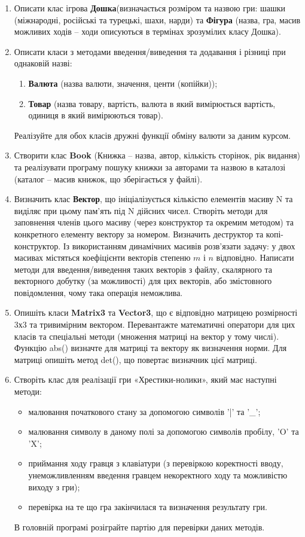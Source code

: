 \documentclass[a5paper,titlepage,openany,twoside,
]
{book_unv}%
\makeatletter
\newcommand{\xslalph}[1]{\expandafter\@xslalph\csname c@#1\endcsname}
\newcommand{\@xslalph}[1]{%
    \ifcase#1\or а\or б\or в\or г\or д\or e\or є\or ж\or з\or i%
    \or й\or к\or л\or м\or н\or о\or п\or р\or с\or т%
    \or у\or ф\or х\or ц\or ч\or ш\or ю\or я\or аа\or бб\or вв%
    \else\@ctrerr\fi%
}
\makeatother
\begin{document}
\begin{enumerate}
\item
  Описати клас ігрова \textbf{Дошка}(визначається розміром та назвою
  гри: шашки (міжнародні, російські та турецькі, шахи, нарди) та
  \textbf{Фігура} (назва, гра, масив можливих ходів -- ходи описуються в
  термінах зрозумілих класу Дошка).

\item
  Описати класи з методами введення/виведення та  додавання і різниці при 
однаковій назві:
\begin{enumerate}[label=\xslalph*)]
\item \textbf{Валюта} (назва валюти, значення, центи (копійки));
\item \textbf{Товар} (назва товару, вартість, валюта в який вимірюється
вартість, одиниця в який вимірюються товар).
\end{enumerate}
Реалізуйте для обох класів дружні функції обміну валюти за даним курсом.

\item
  Створити клас \textbf{Book} (Книжка -- назва, автор, кількість сторінок, рік
  видання) та реалізувати програму пошуку книжки за авторами та назвою в
  каталозі (каталог -- масив книжок, що зберігається у файлі).
  
\item
  Визначить клас \textbf{Вектор}, що ініціалізується кількістю елементів масиву N
  та виділяє при цьому пам'ять під N дійсних чисел. Створіть методи для
  заповнення членів цього масиву (через конструктор та окремим методом)
  та конкретного елементу вектору за номером. Визначить деструктор та
  копі-конструктор. Із використанням динамічних масивів розв'язати
  задачу: у двох масивах містяться коефіцієнти векторів степеню $m$ і $n$
  відповідно. Написати методи для введення/виведення таких векторів з файлу,
  скалярного та векторного добутку (за можливості) для цих векторів, або
 змістовного повідомлення, чому така операція неможлива.
 
\item
  Опишіть класи \textbf{Matrix3} та \textbf{Vector3}, що є відповідно матрицею розмірності
  3х3 та тривимірним вектором. Перевантажте математичні оператори для
  цих класів та спеціальні методи (множення матриці на вектор у тому
  числі). Функцію abs() визначте для матриці та вектору як визначення
  норми. Для матриці опишіть метод det(), що повертає визначник цієї
  матриці.

\item
Створіть клас для реалізації гри «Хрестики-нолики», який має наступні методи: 
\begin{itemize}
\item
малювання початкового стану за допомогою символів '|' та '\_'; 
\item
малювання символу в даному полі за допомогою символів пробілу, 'O' та 'X'; 
\item
приймання ходу гравця з клавіатури (з перевіркою коректності вводу, 
унеможливленням введення гравцем некоректного ходу та можливістю виходу з гри);
\item
перевірка на те що гра закінчилася та визначення результату гри. 
\end{itemize}
В головній програмі розіграйте партію для перевірки даних методів.


\end{enumerate}
\end{document}
